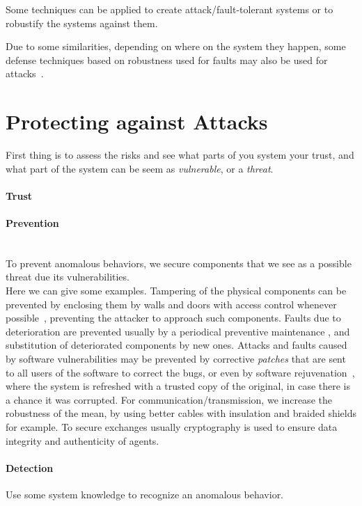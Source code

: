 \documentclass[../main.tex]{subfiles}
\begin{document}
Some techniques can be applied to create attack/fault-tolerant systems or to robustify the systems against them.\cite{SatchidanandanKumar2017}

Due to some similarities, depending on where on the system they happen, some defense techniques based on robustness used for faults may also be used for attacks~\cite{TeixeiraEtAl2015}.



\section{Protecting against Attacks}\label{sec:protecting_against_attacks}
First thing is to assess the risks and see what parts of you system your trust, and what part of the system can be seem as \emph{vulnerable}, or a \emph{threat}.


\paragraph{Trust}

\paragraph{Prevention}
~\\To prevent anomalous behaviors, we secure components that we see as a possible threat due its vulnerabilities.
\\Here we can give some examples.
Tampering of the physical components can be prevented by enclosing them by walls and doors with access control whenever possible~\cite{DingEtAl2018}, preventing the attacker to approach such components.
Faults due to deterioration are prevented usually by a periodical preventive maintenance , and substitution of deteriorated components by new ones.
Attacks and faults caused by software vulnerabilities may be prevented by corrective \emph{patches} that are sent to all users of the software to correct the bugs, or even by software rejuvenation~\cite{GriffioenEtAl2020}, where the system is refreshed with a trusted copy of the original, in case there is a chance it was corrupted.
For communication/transmission, we increase the robustness of the mean, by using better cables with insulation and braided shields for example.
To secure exchanges usually cryptography is used to ensure data integrity and authenticity of agents.

\paragraph{Detection}
Use some system knowledge to recognize an anomalous behavior.
\end{document}
